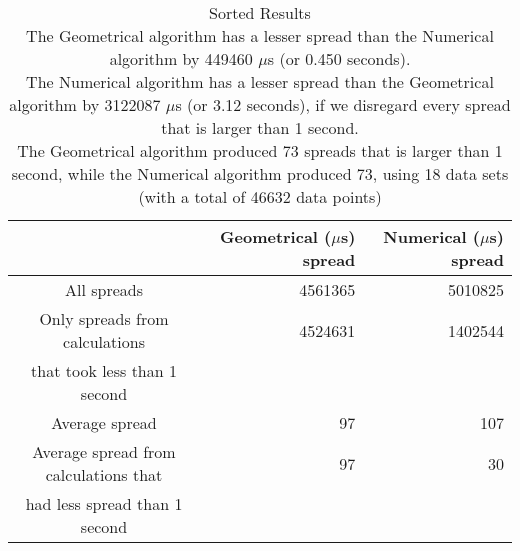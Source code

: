 \begin{table}[bth!]\footnotesize
 \begin{tabular}[3]{c|r|r}
 & Geometrical ($\mu$s) spread & Numerical ($\mu$s) spread\\
\hline
All spreads & 4561365 & 5010825 \\ 
\hline 
Only spreads from calculations & 4524631 & 1402544 \\ 
that took less than 1 second & & \\ 
\hline
Average spread & 97 & 107 \\
\hline
Average spread from calculations that & 97 & 30 \\ 
had less spread than 1 second & & \\ 
\end{tabular}\\ \\
\caption{Sorted  Results\\
The Geometrical algorithm has a lesser spread than the Numerical algorithm by 449460 $\mu$s (or 0.450 seconds).\\
The Numerical algorithm has a lesser spread than the Geometrical algorithm by 3122087 $\mu$s (or 3.12 seconds), if we disregard every spread that is larger than 1 second.\\
The Geometrical algorithm produced 73 spreads that is larger than 1 second, while the Numerical algorithm produced 73, using 18 data sets (with a total of 46632 data points)\\
}\label{total-normal_spreadtable}\end{table}